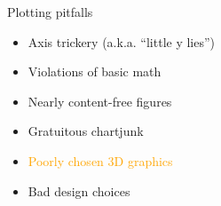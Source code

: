 \documentclass[
  ignorenonframetext,
]{beamer}
\providecommand{\tightlist}{%
  \setlength{\itemsep}{0pt}\setlength{\parskip}{0pt}}
\begin{document}
\begin{frame}{}
\label{section-20}
\end{frame}

\begin{frame}{}
\label{section-21}
\end{frame}

\begin{frame}{Plotting pitfalls}
\label{plotting-pitfalls-4}
\begin{itemize}
\tightlist
\item
  Axis trickery (a.k.a. ``little y lies'')
\item
  Violations of basic math
\item
  Nearly content-free figures
\item
  Gratuitous chartjunk
\item
  \textcolor{orange}{Poorly chosen 3D graphics}
\item
  Bad design choices
\end{itemize}
\end{frame}
\end{document}
